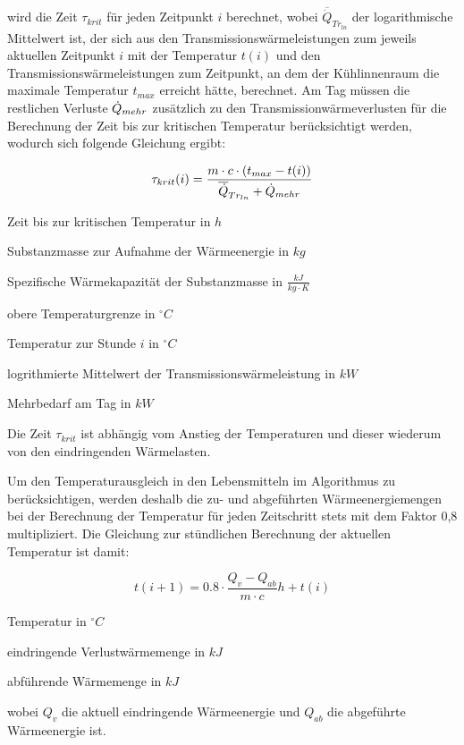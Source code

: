 wird die Zeit $\tau_{krit}$ für jeden Zeitpunkt $i$ berechnet, wobei
$\overline{\dot{Q}}_{Tr_{ln}}$ der logarithmische Mittelwert ist, der sich aus
den Transmissionswärmeleistungen zum jeweils aktuellen Zeitpunkt $i$ mit der
Temperatur $t(i)$ und den Transmissionswärmeleistungen zum Zeitpunkt, an dem der
Kühlinnenraum die maximale Temperatur $t_{max}$ erreicht hätte, berechnet. Am
Tag müssen die restlichen Verluste $\pmehr$ zusätzlich zu den
Transmissionwärmeverlusten für die Berechnung der Zeit bis zur kritischen
Temperatur berücksichtigt werden, wodurch sich folgende Gleichung ergibt:

\begin{equation}
	\tau_{krit}(i) = \frac{m \cdot c \cdot (t_{max} -
		t(i))}{{\overline{\dot{Q}}_{Tr_{ln}}} + \pmehr}
\label{taukd}
\end{equation}

\begin{description}[\dth]

	\item[$\tau_{krit}$] Zeit bis zur kritischen Temperatur in $h$
	\item[$m$] Substanzmasse zur Aufnahme der Wärmeenergie in $kg$
	\item[$c$] Spezifische Wärmekapazität der Substanzmasse in $\frac{kJ}{kg
		\cdot K}$
	\item[$t_{max}$] obere Temperaturgrenze in $ ^{\circ} C $
	\item[$t(i)$] Temperatur zur Stunde $i$ in $ ^{\circ} C $
	\item[$\aptranslog$] logrithmierte Mittelwert der
		Transmissionswärmeleistung in $kW$
	\item[$\pmehr$] Mehrbedarf am Tag in $kW$

\end{description}
\vspace{0.5cm}

Die Zeit $\tau_{krit}$ ist abhängig vom Anstieg der Temperaturen und dieser
wiederum von den eindringenden Wärmelasten.

Um den Temperaturausgleich in den Lebensmitteln im Algorithmus zu
berücksichtigen, werden deshalb die zu- und abgeführten Wärmeenergiemengen bei
der Berechnung der Temperatur für jeden Zeitschritt stets mit dem Faktor 0,8
multipliziert.  Die Gleichung zur stündlichen Berechnung der aktuellen
Temperatur ist damit:

\begin{equation}
	t(i+1) = 0.8 \cdot \frac{Q_v - Q_{ab}}{m \cdot c}h + t(i)
\label{tns}
\end{equation}

\begin{description}[\dth]

	\item[$t$] Temperatur in $^{\circ} C$
	\item[$Q_v$] eindringende Verlustwärmemenge in $kJ$
	\item[$Q_{ab}$] abführende Wärmemenge in $kJ$

\end{description}
\vspace{0.5cm}

wobei $Q_v$ die aktuell eindringende Wärmeenergie und $Q_{ab}$ die abgeführte
Wärmeenergie ist.
